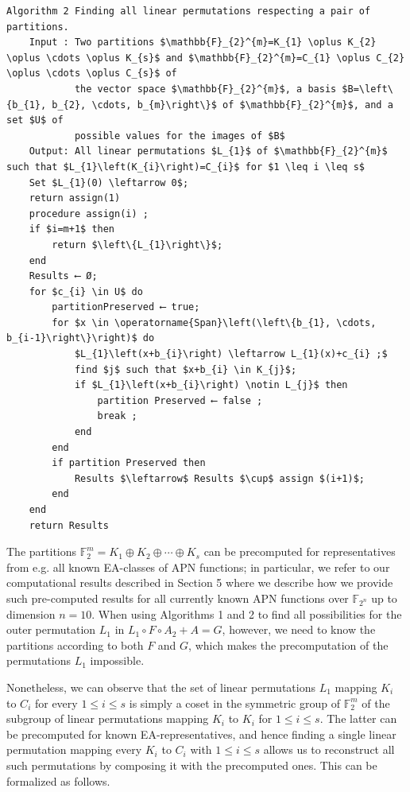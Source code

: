 \documentclass[10pt]{article}
\begin{document}
\begin{verbatim}
Algorithm 2 Finding all linear permutations respecting a pair of partitions.
    Input : Two partitions $\mathbb{F}_{2}^{m}=K_{1} \oplus K_{2} \oplus \cdots \oplus K_{s}$ and $\mathbb{F}_{2}^{m}=C_{1} \oplus C_{2} \oplus \cdots \oplus C_{s}$ of
            the vector space $\mathbb{F}_{2}^{m}$, a basis $B=\left\{b_{1}, b_{2}, \cdots, b_{m}\right\}$ of $\mathbb{F}_{2}^{m}$, and a set $U$ of
            possible values for the images of $B$
    Output: All linear permutations $L_{1}$ of $\mathbb{F}_{2}^{m}$ such that $L_{1}\left(K_{i}\right)=C_{i}$ for $1 \leq i \leq s$
    Set $L_{1}(0) \leftarrow 0$;
    return assign(1)
    procedure assign(i) ;
    if $i=m+1$ then
        return $\left\{L_{1}\right\}$;
    end
    Results ⟵ Ø;
    for $c_{i} \in U$ do
        partitionPreserved ⟵ true;
        for $x \in \operatorname{Span}\left(\left\{b_{1}, \cdots, b_{i-1}\right\}\right)$ do
            $L_{1}\left(x+b_{i}\right) \leftarrow L_{1}(x)+c_{i} ;$
            find $j$ such that $x+b_{i} \in K_{j}$;
            if $L_{1}\left(x+b_{i}\right) \notin L_{j}$ then
                partition Preserved ⟵ false ;
                break ;
            end
        end
        if partition Preserved then
            Results $\leftarrow$ Results $\cup$ assign $(i+1)$;
        end
    end
    return Results
\end{verbatim}

The partitions $\mathbb{F}_{2}^{m}=K_{1} \oplus K_{2} \oplus \cdots \oplus K_{s}$ can be precomputed for representatives from e.g. all known EA-classes of APN functions; in particular, we refer to our computational results described in Section 5 where we describe how we provide such pre-computed results for all currently known APN functions over $\mathbb{F}_{2^{n}}$ up to dimension $n=10$. When using Algorithms 1 and 2 to find all possibilities for the outer permutation $L_{1}$ in $L_{1} \circ F \circ A_{2}+A=G$, however, we need to know the partitions according to both $F$ and $G$, which makes the precomputation of the permutations $L_{1}$ impossible.

Nonetheless, we can observe that the set of linear permutations $L_{1}$ mapping $K_{i}$ to $C_{i}$ for every $1 \leq i \leq s$ is simply a coset in the symmetric group of $\mathbb{F}_{2}^{m}$ of the subgroup of linear permutations mapping $K_{i}$ to $K_{i}$ for $1 \leq i \leq s$. The latter can be precomputed for known EA-representatives, and hence finding a single linear permutation mapping every $K_{i}$ to $C_{i}$ with $1 \leq i \leq s$ allows us to reconstruct all such permutations by composing it with the precomputed ones. This can be formalized as follows.
\end{document}
